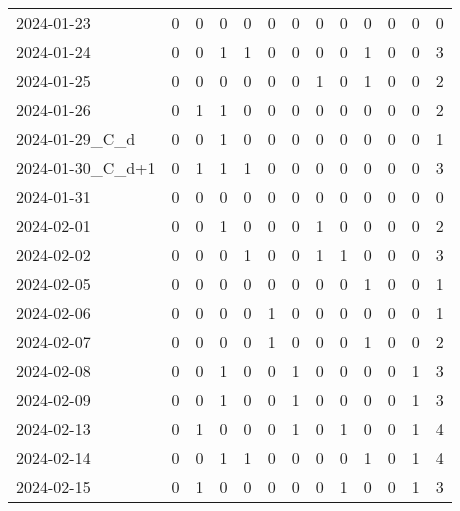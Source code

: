 \documentclass[dvipdfmx,oneside]{article}
\begin{document}
\begin{longtable}{lcccccccccccc}
        2024-01-23 &     0 &     0 &     0 &     0 &     0 &     0 &     0 &     0 &     0 &     0 &     0 &      0 \\
        2024-01-24 &     0 &     0 &     1 &     1 &     0 &     0 &     0 &     0 &     1 &     0 &     0 &      3 \\
        2024-01-25 &     0 &     0 &     0 &     0 &     0 &     0 &     1 &     0 &     1 &     0 &     0 &      2 \\
        2024-01-26 &     0 &     1 &     1 &     0 &     0 &     0 &     0 &     0 &     0 &     0 &     0 &      2 \\
  2024-01-29\_C\_d &     0 &     0 &     1 &     0 &     0 &     0 &     0 &     0 &     0 &     0 &     0 &      1 \\
2024-01-30\_C\_d+1 &     0 &     1 &     1 &     1 &     0 &     0 &     0 &     0 &     0 &     0 &     0 &      3 \\
        2024-01-31 &     0 &     0 &     0 &     0 &     0 &     0 &     0 &     0 &     0 &     0 &     0 &      0 \\
        2024-02-01 &     0 &     0 &     1 &     0 &     0 &     0 &     1 &     0 &     0 &     0 &     0 &      2 \\
        2024-02-02 &     0 &     0 &     0 &     1 &     0 &     0 &     1 &     1 &     0 &     0 &     0 &      3 \\
        2024-02-05 &     0 &     0 &     0 &     0 &     0 &     0 &     0 &     0 &     1 &     0 &     0 &      1 \\
        2024-02-06 &     0 &     0 &     0 &     0 &     1 &     0 &     0 &     0 &     0 &     0 &     0 &      1 \\
        2024-02-07 &     0 &     0 &     0 &     0 &     1 &     0 &     0 &     0 &     1 &     0 &     0 &      2 \\
        2024-02-08 &     0 &     0 &     1 &     0 &     0 &     1 &     0 &     0 &     0 &     0 &     1 &      3 \\
        2024-02-09 &     0 &     0 &     1 &     0 &     0 &     1 &     0 &     0 &     0 &     0 &     1 &      3 \\
        2024-02-13 &     0 &     1 &     0 &     0 &     0 &     1 &     0 &     1 &     0 &     0 &     1 &      4 \\
        2024-02-14 &     0 &     0 &     1 &     1 &     0 &     0 &     0 &     0 &     1 &     0 &     1 &      4 \\
        2024-02-15 &     0 &     1 &     0 &     0 &     0 &     0 &     0 &     1 &     0 &     0 &     1 &      3 \\

\end{longtable}
\end{document}
